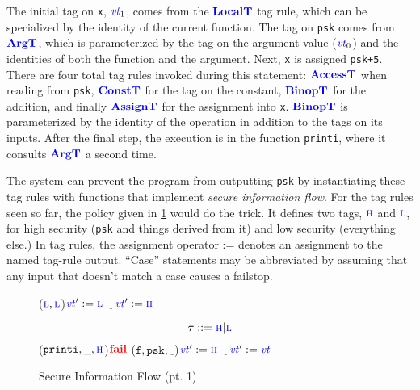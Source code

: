 \documentclass{llncs}
\begin{document}
The initial tag on {\tt x}, \(\mathit{\color{blue} vt}_1\), comes from the \(\color{blue} \mathbf{LocalT}\) tag rule,
which can be specialized by the identity of the current function. The tag on {\tt psk}
comes from \(\color{blue} \mathbf{ArgT}\), which is parameterized by the tag on the argument value (\(\mathit{\color{blue} vt}_0\)) and
the identities of both the function and the argument. Next, {\tt x} is assigned {\tt psk+5}.
There are four total tag rules invoked during this statement: \(\color{blue} \mathbf{AccessT}\) when reading
from {\tt psk}, \(\color{blue} \mathbf{ConstT}\) for the tag on the constant, \(\color{blue} \mathbf{BinopT}\) for the addition,
and finally \(\color{blue} \mathbf{AssignT}\) for the assignment into {\tt x}. \(\color{blue} \mathbf{BinopT}\) is parameterized
by the identity of the operation in addition to the tags on its inputs.
After the final step, the execution is in the function {\tt printi}, where it consults
\(\color{blue} \mathbf{ArgT}\) a second time.

The system can prevent the program from outputting {\tt psk} by instantiating these tag rules with
functions that implement {\em secure information flow}. For the tag rules seen so far, the policy given in
\cref{fig:example1rules} would do the trick. It defines two tags, \(\textnormal{\color{blue} \sc h}\) and \(\textnormal{\color{blue} \sc l}\), for high
security ({\tt psk} and things derived from it) and low security (everything else.) In tag rules,
the assignment operator := denotes an assignment to the named tag-rule output. ``Case'' statements
may be abbreviated by assuming that any input that doesn't match a case causes a failstop.

\begin{figure}
  \begin{minipage}{0.5\textwidth}
    \consttruleblock{\(\vt := \low\)}
    \localtruleblock{\(\vt := \low\)}

    \binoptruleblock
        {
          {(\(\textnormal{\color{blue} \sc l},\textnormal{\color{blue} \sc l}\))}{\(\mathit{\color{blue} vt}':=\textnormal{\color{blue} \sc l}\)}
          {\(\underline{~~~}\)}{\(\mathit{\color{blue} vt}':=\textnormal{\color{blue} \sc h}\)}}
  \end{minipage}
  \begin{minipage}{0.4\textwidth}
    \[\tau::=\textnormal{\color{blue} \sc h} | \textnormal{\color{blue} \sc l}\]
    \argtruleblock
        {
          {(\(\mathtt{printi},\underline{~~},\textnormal{\color{blue} \sc h}\))}{\(\mathbf{\color{red} fail}\)}
          {(\(\mathtt{f},\mathtt{psk},\underline{~~}\))}{\(\mathit{\color{blue} vt}':=\textnormal{\color{blue} \sc h}\)}
          {\(\underline{~~~}\)}{\(\mathit{\color{blue} vt}':=\mathit{\color{blue} vt}\)}}
  \end{minipage}

  \caption{Secure Information Flow (pt. 1)}
  \label{fig:example1rules}
\end{figure}
\end{document}
